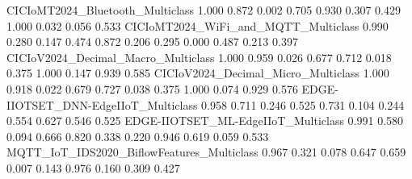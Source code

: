 CICIoMT2024_Bluetooth_Multiclass                                           1.000            0.872                                    0.002                           0.705           0.930                    0.307                                                     0.429                                     1.000                                     0.032                              0.056   0.533
CICIoMT2024_WiFi_and_MQTT_Multiclass                                       0.990            0.280                                    0.147                           0.474           0.872                    0.206                                                     0.295                                     0.000                                     0.487                              0.213   0.397
CICIoV2024_Decimal_Macro_Multiclass                                        1.000            0.959                                    0.026                           0.677           0.712                    0.018                                                     0.375                                     1.000                                     0.147                              0.939   0.585
CICIoV2024_Decimal_Micro_Multiclass                                        1.000            0.918                                    0.022                           0.679           0.727                    0.038                                                     0.375                                     1.000                                     0.074                              0.929   0.576
EDGE-IIOTSET_DNN-EdgeIIoT_Multiclass                                       0.958            0.711                                    0.246                           0.525           0.731                    0.104                                                     0.244                                     0.554                                     0.627                              0.546   0.525
EDGE-IIOTSET_ML-EdgeIIoT_Multiclass                                        0.991            0.580                                    0.094                           0.666           0.820                    0.338                                                     0.220                                     0.946                                     0.619                              0.059   0.533
MQTT_IoT_IDS2020_BiflowFeatures_Multiclass                                 0.967            0.321                                    0.078                           0.647           0.659                    0.007                                                     0.143                                     0.976                                     0.160                              0.309   0.427
